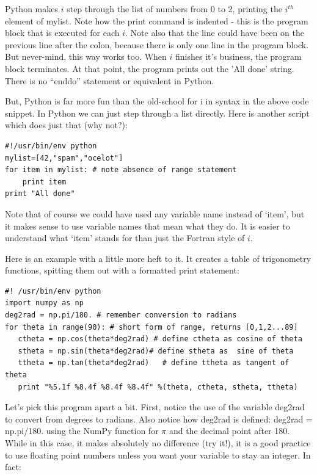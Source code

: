 \documentclass[11pt]{book}
\begin{document}
{{{{   Python makes $i$ step through the list of numbers from 0 to 2, printing the $i^{th}$ element of {\color{blue}mylist}.  Note how the print command is indented - this is the program block that is executed for each $i$.   Note also that the line could have been on the previous line after the colon, because there is only one line in the program block.  But never-mind, this way works too.   When $i$ finishes it's business, the program block terminates.   At that point, the program prints out the 'All done' string.   There is no ``enddo'' statement or equivalent in Python.

But, Python is far more fun than the old-school {\color{blue}for i in} syntax in the above code snippet.  In Python we can just step through a list directly.  Here is another  script which does just that (why not?):

{ \color{blue} \begin{verbatim}
#!/usr/bin/env python
mylist=[42,"spam","ocelot"]
for item in mylist: # note absence of range statement
    print item
print "All done"
\end{verbatim}}

\noindent Note that of course we could have used any variable name instead of `item', but it makes sense to use variable names that mean what they do.  It is easier to understand what `item' stands for than just the Fortran style of $i$.

Here is an example with a little more heft to it.  It creates a table of trigonometry functions, spitting them out with a formatted print statement:

{ \color{blue} \begin{verbatim}
#! /usr/bin/env python
import numpy as np
deg2rad = np.pi/180. # remember conversion to radians
for theta in range(90): # short form of range, returns [0,1,2...89]
   ctheta = np.cos(theta*deg2rad) # define ctheta as cosine of theta
   stheta = np.sin(theta*deg2rad)# define stheta as  sine of theta
   ttheta = np.tan(theta*deg2rad)   # define ttheta as tangent of theta
   print "%5.1f %8.4f %8.4f %8.4f" %(theta, ctheta, stheta, ttheta)
 \end{verbatim}}

 Let's pick this program apart a bit.  First,
notice the use of the variable {\color{blue}deg2rad} to convert from degrees to radians.  Also notice how deg2rad is defined: {\color{blue}deg2rad = np.pi/180.} using the {\color{blue}NumPy} function for $\pi$ and the decimal point after 180.  While in this case, it makes absolutely no difference (try it!), it is a good practice to use floating point numbers unless you want your variable to stay an integer.  In fact:

}}}}
\end{document}
